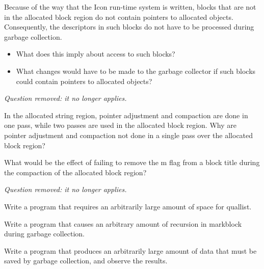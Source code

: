 Because of the way that the Icon run-time system
is written, blocks that are not in the allocated block region do not
contain pointers to allocated objects. Consequently, the descriptors
in such blocks do not have to be processed during garbage collection.

\begin{itemize}
\item What does this imply about access to such blocks?

\item What changes would have to be made to the garbage collector if
such blocks could contain pointers to allocated objects?

\end{itemize}

{\em Question removed: it no longer applies.}

In the allocated string region, pointer
adjustment and compaction are done in one pass, while two passes are
used in the allocated block region. Why are pointer adjustment and
compaction not done in a single pass over the allocated block region?

What would be the effect of failing to remove
the m flag from a block title during the compaction of the allocated
block region?

{\em Question removed: it no longer applies.}

Write a program that requires an arbitrarily
large amount of space for quallist.

Write a program that causes an arbitrary amount
of recursion in markblock during garbage collection.

Write a program that produces an arbitrarily
large amount of data that must be saved by garbage collection, and
observe the results.

